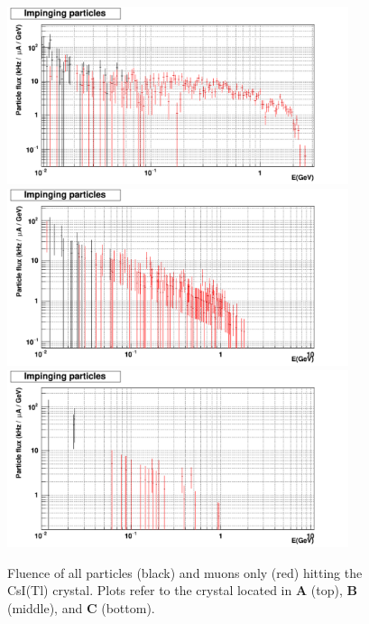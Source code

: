 \begin{figure}[h!] 
\center
\includegraphics[width=10.0cm]{figs/fig10.pdf}
\includegraphics[width=10.0cm]{figs/fig19_crsB.pdf}
\includegraphics[width=10.0cm]{figs/fig19_crsC.pdf}
\caption {Fluence  of all particles (black) and muons only (red) hitting the CsI(Tl) crystal.
Plots refer to the crystal located in {\bf A} (top),  {\bf B} (middle), and {\bf C} (bottom).}
\label{fig:fluence-mAs}
\end{figure}

